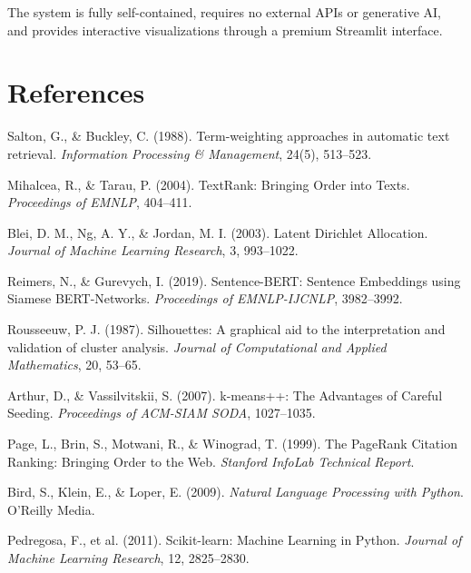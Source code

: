 \documentclass[12pt, a4paper]{article}
\begin{document}
The system is fully self-contained, requires no external APIs or generative AI, and provides interactive visualizations through a premium Streamlit interface.

\section*{References}
\enlargethispage{2cm}
\small
\begin{enumerate}[nosep, label={[\arabic*]}]
    \item Salton, G., \& Buckley, C. (1988). Term-weighting approaches in automatic text retrieval. \textit{Information Processing \& Management}, 24(5), 513--523.
    \item Mihalcea, R., \& Tarau, P. (2004). TextRank: Bringing Order into Texts. \textit{Proceedings of EMNLP}, 404--411.
    \item Blei, D. M., Ng, A. Y., \& Jordan, M. I. (2003). Latent Dirichlet Allocation. \textit{Journal of Machine Learning Research}, 3, 993--1022.
    \item Reimers, N., \& Gurevych, I. (2019). Sentence-BERT: Sentence Embeddings using Siamese BERT-Networks. \textit{Proceedings of EMNLP-IJCNLP}, 3982--3992.
    \item Rousseeuw, P. J. (1987). Silhouettes: A graphical aid to the interpretation and validation of cluster analysis. \textit{Journal of Computational and Applied Mathematics}, 20, 53--65.
    \item Arthur, D., \& Vassilvitskii, S. (2007). k-means++: The Advantages of Careful Seeding. \textit{Proceedings of ACM-SIAM SODA}, 1027--1035.
    \item Page, L., Brin, S., Motwani, R., \& Winograd, T. (1999). The PageRank Citation Ranking: Bringing Order to the Web. \textit{Stanford InfoLab Technical Report}.
    \item Bird, S., Klein, E., \& Loper, E. (2009). \textit{Natural Language Processing with Python}. O'Reilly Media.
    \item Pedregosa, F., et al. (2011). Scikit-learn: Machine Learning in Python. \textit{Journal of Machine Learning Research}, 12, 2825--2830.
\end{enumerate}
\end{document}
